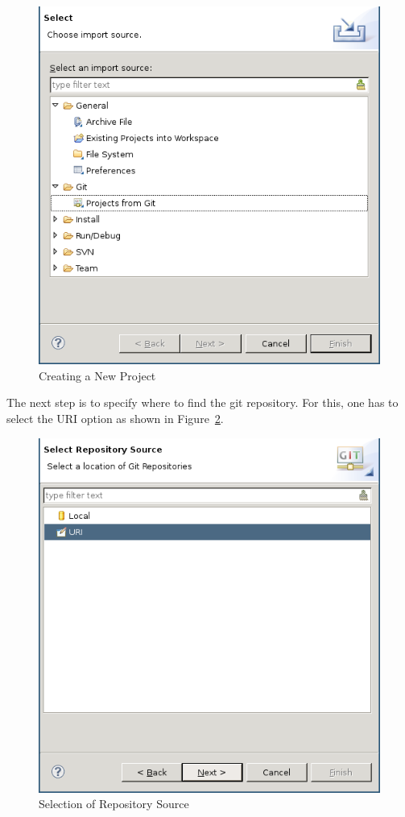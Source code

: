 \documentclass[10pt,a4paper]{article}
\newcommand{\skalierung}{.6}
\begin{document}
\begin{figure}[H]
  \centering
  \includegraphics[width=\skalierung\textwidth]{project_import_step1}
  \caption{Creating a New Project}
  \label{fig:create-new-project}
\end{figure}

The next step is to specify where to find the git repository. For this, one has
to select the URI option as shown in Figure~\ref{fig:select-repo-source}.

\begin{figure}[H]
  \centering
  \includegraphics[width=\skalierung\textwidth]{project_import_step2}
  \caption{Selection of Repository Source}
  \label{fig:select-repo-source}
\end{figure}
\end{document}
